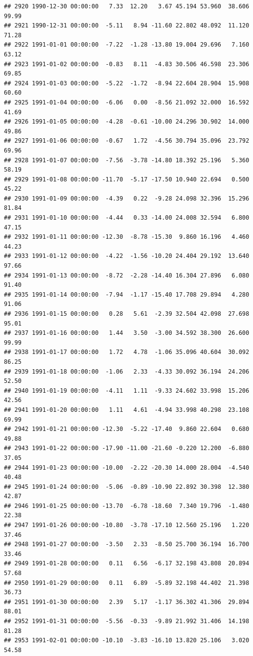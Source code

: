 \documentclass{article}\usepackage{graphicx, color}
\makeatletter
\newenvironment{kframe}{%
 \def\at@end@of@kframe{}%
 \ifinner\ifhmode%
  \def\at@end@of@kframe{\end{minipage}}%
  \begin{minipage}{\columnwidth}%
 \fi\fi%
 \def\FrameCommand##1{\hskip\@totalleftmargin \hskip-\fboxsep
 \colorbox{shadecolor}{##1}\hskip-\fboxsep
     \hskip-\linewidth \hskip-\@totalleftmargin \hskip\columnwidth}%
 \MakeFramed {\advance\hsize-\width
   \@totalleftmargin\z@ \linewidth\hsize
   \@setminipage}}%
 {\par\unskip\endMakeFramed%
 \at@end@of@kframe}
\newenvironment{knitrout}{}{} %
\makeatother
\begin{document}
\begin{knitrout}
\begin{kframe}
\begin{verbatim}
## 2920 1990-12-30 00:00:00   7.33  12.20   3.67 45.194 53.960  38.606  99.99
## 2921 1990-12-31 00:00:00  -5.11   8.94 -11.60 22.802 48.092  11.120  71.28
## 2922 1991-01-01 00:00:00  -7.22  -1.28 -13.80 19.004 29.696   7.160  63.12
## 2923 1991-01-02 00:00:00  -0.83   8.11  -4.83 30.506 46.598  23.306  69.85
## 2924 1991-01-03 00:00:00  -5.22  -1.72  -8.94 22.604 28.904  15.908  60.60
## 2925 1991-01-04 00:00:00  -6.06   0.00  -8.56 21.092 32.000  16.592  41.69
## 2926 1991-01-05 00:00:00  -4.28  -0.61 -10.00 24.296 30.902  14.000  49.86
## 2927 1991-01-06 00:00:00  -0.67   1.72  -4.56 30.794 35.096  23.792  69.96
## 2928 1991-01-07 00:00:00  -7.56  -3.78 -14.80 18.392 25.196   5.360  58.19
## 2929 1991-01-08 00:00:00 -11.70  -5.17 -17.50 10.940 22.694   0.500  45.22
## 2930 1991-01-09 00:00:00  -4.39   0.22  -9.28 24.098 32.396  15.296  81.84
## 2931 1991-01-10 00:00:00  -4.44   0.33 -14.00 24.008 32.594   6.800  47.15
## 2932 1991-01-11 00:00:00 -12.30  -8.78 -15.30  9.860 16.196   4.460  44.23
## 2933 1991-01-12 00:00:00  -4.22  -1.56 -10.20 24.404 29.192  13.640  97.66
## 2934 1991-01-13 00:00:00  -8.72  -2.28 -14.40 16.304 27.896   6.080  91.40
## 2935 1991-01-14 00:00:00  -7.94  -1.17 -15.40 17.708 29.894   4.280  91.06
## 2936 1991-01-15 00:00:00   0.28   5.61  -2.39 32.504 42.098  27.698  95.01
## 2937 1991-01-16 00:00:00   1.44   3.50  -3.00 34.592 38.300  26.600  99.99
## 2938 1991-01-17 00:00:00   1.72   4.78  -1.06 35.096 40.604  30.092  86.25
## 2939 1991-01-18 00:00:00  -1.06   2.33  -4.33 30.092 36.194  24.206  52.50
## 2940 1991-01-19 00:00:00  -4.11   1.11  -9.33 24.602 33.998  15.206  42.56
## 2941 1991-01-20 00:00:00   1.11   4.61  -4.94 33.998 40.298  23.108  69.99
## 2942 1991-01-21 00:00:00 -12.30  -5.22 -17.40  9.860 22.604   0.680  49.88
## 2943 1991-01-22 00:00:00 -17.90 -11.00 -21.60 -0.220 12.200  -6.880  37.05
## 2944 1991-01-23 00:00:00 -10.00  -2.22 -20.30 14.000 28.004  -4.540  40.48
## 2945 1991-01-24 00:00:00  -5.06  -0.89 -10.90 22.892 30.398  12.380  42.87
## 2946 1991-01-25 00:00:00 -13.70  -6.78 -18.60  7.340 19.796  -1.480  22.38
## 2947 1991-01-26 00:00:00 -10.80  -3.78 -17.10 12.560 25.196   1.220  37.46
## 2948 1991-01-27 00:00:00  -3.50   2.33  -8.50 25.700 36.194  16.700  33.46
## 2949 1991-01-28 00:00:00   0.11   6.56  -6.17 32.198 43.808  20.894  57.68
## 2950 1991-01-29 00:00:00   0.11   6.89  -5.89 32.198 44.402  21.398  36.73
## 2951 1991-01-30 00:00:00   2.39   5.17  -1.17 36.302 41.306  29.894  88.01
## 2952 1991-01-31 00:00:00  -5.56  -0.33  -9.89 21.992 31.406  14.198  81.28
## 2953 1991-02-01 00:00:00 -10.10  -3.83 -16.10 13.820 25.106   3.020  54.58

\end{verbatim}
\end{kframe}
\end{knitrout}
\end{document}
